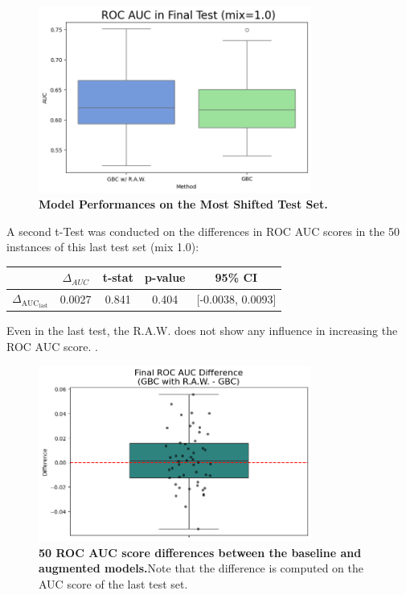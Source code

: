 \begin{figure}[H]
    \centering
    \includegraphics[width=0.8\textwidth]{assets/RealRawLAST.png} 
    \caption{\textbf{Model Performances on the Most Shifted Test Set.}}
\end{figure}

A second t-Test was conducted on the differences in ROC AUC scores in the 50 instances of this last test set (mix 1.0):


\begin{table}[H]
    \centering
    \begin{tabular}{lcccc}
        \toprule
        & $\Delta_{AUC}$ & t-stat & p-value & 95\% CI \\
        \midrule
        $\Delta_{\text{AUC}_{\text{last}}}$ & 0.0027 & 0.841 & 0.404 & [-0.0038, 0.0093] \\
        \bottomrule
    \end{tabular}
\end{table}

Even in the last test, the R.A.W. does not show any influence in increasing the ROC AUC score. . 

\begin{figure}[H]
    \centering
    \includegraphics[width=0.8\textwidth]{assets/RealRawDiffLAST.png} 
    \caption{\textbf{50 ROC AUC score differences between the baseline and augmented models.}Note that the difference is computed on the AUC score of the last test set.}
\end{figure}





